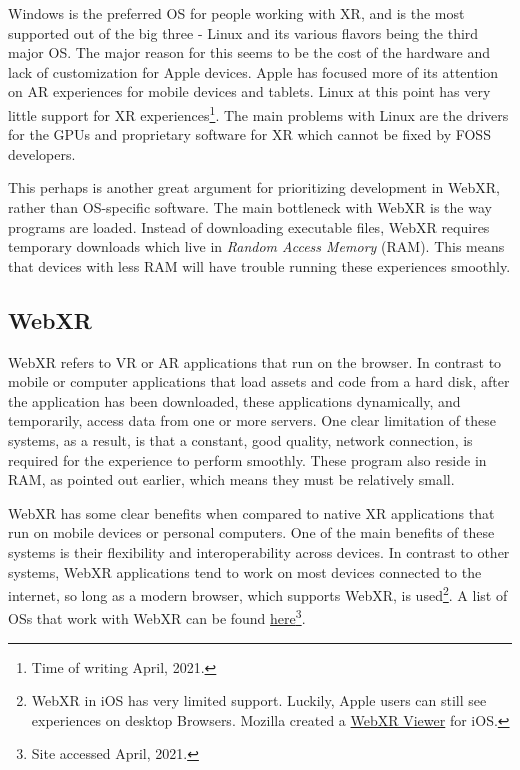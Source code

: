 Windows is the preferred OS for people working with XR, and is the most supported out of the big three - Linux and its various flavors being the third major OS. The major reason for this seems to be the cost of the hardware and lack of customization for Apple devices. Apple has focused more of its attention on AR experiences for mobile devices and tablets. Linux at this point has very little support for XR experiences\footnote{Time of writing April, 2021.}. The main problems with Linux are the drivers for the GPUs and proprietary software for XR which cannot be fixed by FOSS developers. 

This perhaps is another great argument for prioritizing development in WebXR, rather than OS-specific software. The main bottleneck with WebXR is the way programs are loaded. Instead of downloading executable files, WebXR requires temporary downloads which live in \textit{Random Access Memory} (RAM). This means that devices with less RAM will have trouble running these experiences smoothly. 



\subsection{WebXR}

WebXR refers to VR or AR applications that run on the browser. In contrast to mobile or computer applications that load assets and code from a hard disk, after the application has been downloaded, these applications dynamically, and temporarily, access data from one or more servers. One clear limitation of these systems, as a result, is that a constant, good quality, network connection, is required for the experience to perform smoothly. These program also reside in RAM, as pointed out earlier, which means they must be relatively small. 

WebXR has some clear benefits when compared to native XR applications that run on mobile devices or personal computers. One of the main benefits of these systems is their flexibility and interoperability across devices. In contrast to other systems, WebXR applications tend to work on most devices connected to the internet, so long as a modern browser, which supports WebXR, is used\footnote{WebXR in iOS has very limited support. Luckily, Apple users can still see experiences on desktop Browsers. Mozilla created a \href{https://webxr-ios.webxrexperiments.com/}{WebXR Viewer} for iOS.}. A list of OSs that work with WebXR can be found \href{https://webvr.rocks/}{here}\footnote{Site accessed April, 2021.}. 

